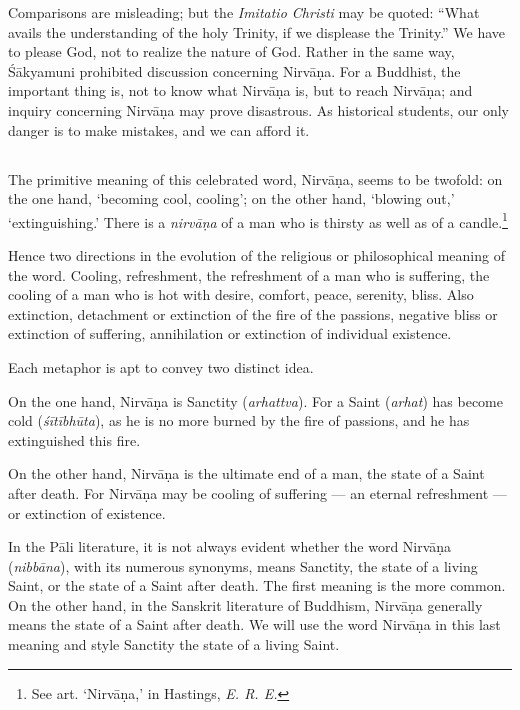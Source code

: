 \documentclass[a4paper, 11pt, oneside, english, landscape]{article}
\begin{document}
Comparisons are misleading; but the \emph{Imitatio Christi} may be quoted: ``What avails the understanding of the holy Trinity, if we displease the Trinity.'' We have to please God, not to realize the nature of God. Rather in the same way, Śākyamuni prohibited discussion concerning Nirvāṇa. For a Buddhist, the important thing is, not to know what Nirvāṇa is, but to reach Nirvāṇa; and inquiry concerning Nirvāṇa may prove disastrous. As historical students, our only danger is to make mistakes, and we can afford it.

\subsection{}
\paragraph{}
The primitive meaning of this celebrated word, Nirvāṇa, seems to be twofold: on the one hand, `becoming cool, cooling'; on the other hand, `blowing out,' `extinguishing.' There is a \emph{nirvāṇa} of a man who is thirsty as well as of a candle.\footnote{See art. `Nirvāṇa,' in Hastings, \emph{E. R. E.}}

Hence two directions in the evolution of the religious or philosophical meaning of the word. Cooling, refreshment, the refreshment of a man who is suffering, the cooling of a man who is hot with desire, comfort, peace, serenity, bliss. Also extinction, detachment or extinction of the fire of the passions, negative bliss or extinction of suffering, annihilation or extinction of individual existence.

Each metaphor is apt to convey two distinct idea.

On the one hand, Nirvāṇa is Sanctity (\emph{arhattva}). For a Saint (\emph{arhat}) has become cold (\emph{śītībhūta}), as he is no more burned by the fire of passions, and he has extinguished this fire.

On the other hand, Nirvāṇa is the ultimate end of a man, the state of a Saint after death. For Nirvāṇa may be cooling of suffering --- an eternal refreshment --- or extinction of existence.

In the Pāli literature, it is not always evident whether the word Nirvāṇa (\emph{nibbāna}), with its numerous synonyms, means Sanctity, the state of a living Saint, or the state of a Saint after death. The first meaning is the more common. On the other hand, in the Sanskrit literature of Buddhism, Nirvāṇa generally means the state of a Saint after death. We will use the word Nirvāṇa in this last meaning and style Sanctity the state of a living Saint.
\end{document}
